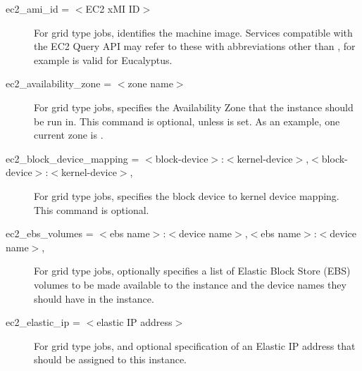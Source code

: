 \begin{description}

\label{condor-submit-ec2-ami-id}
\item[ec2\_ami\_id = $<$EC2 xMI ID$>$]
For grid type  jobs, identifies the machine image.
Services compatible with the EC2 Query API may refer to these
with abbreviations other than ,
for example  is valid for Eucalyptus.


\label{condor-submit-ec2-availability-zone}
\item[ec2\_availability\_zone = $<$zone name$>$]
For grid type  jobs, 
specifies the Availability Zone that the instance should be run in. 
This command is optional, unless  is set.
As an example, one current zone is .


\label{condor-submit-ec2-block-device-mapping}
\item[ec2\_block\_device\_mapping = $<$block-device$>$:$<$kernel-device$>$,$<$block-device$>$:$<$kernel-device$>$, \Dots]
For grid type  jobs,
specifies the block device to kernel device mapping.
This command is optional.


\label{condor-submit-ec2-ebs-volumes}
\item[ec2\_ebs\_volumes = $<$ebs name$>$:$<$device name$>$,$<$ebs name$>$:$<$device name$>$,\Dots]
For grid type  jobs,
optionally specifies a list of Elastic Block Store (EBS)
volumes to be made available to the instance and the device names they
should have in the instance.


\label{condor-submit-ec2-elastic-id}
\item[ec2\_elastic\_ip = $<$elastic IP address$>$]
For grid type  jobs,
and optional specification of an Elastic IP address 
that should be assigned to this instance.



\end{description}
